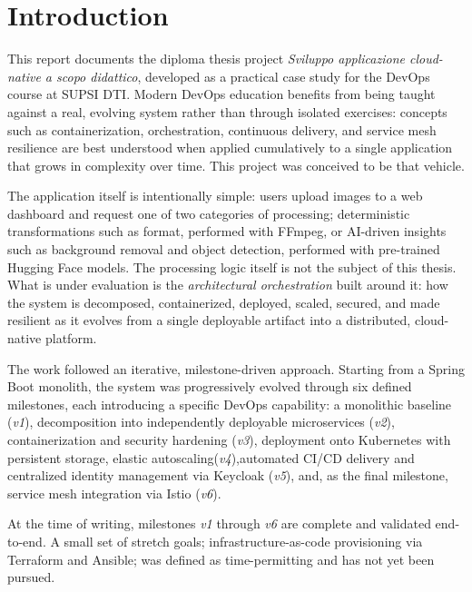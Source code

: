 \documentclass[twoside]{supsistudent}
\begin{document}
\tableofcontents
\listoffigures					%
\listoftables					%

\newpage
\mainmatter
{}
\setcounter{page}{1}

\chapter{Introduction}
This report documents the diploma thesis project \emph{Sviluppo applicazione cloud-native a scopo didattico}, developed as a practical case study for the DevOps course at SUPSI DTI. Modern DevOps education benefits from being taught against a real, evolving system rather than through isolated exercises: concepts such as containerization, orchestration, continuous delivery, and service mesh resilience are best understood when applied cumulatively to a single application that grows in complexity over time. This project was conceived to be that vehicle.

The application itself is intentionally simple: users upload images to a web dashboard and request one of two categories of processing; deterministic transformations such as format, performed with FFmpeg, or AI-driven insights such as background removal and object detection, performed with pre-trained Hugging Face models. The processing logic itself is not the subject of this thesis. What is under evaluation is the \emph{architectural orchestration} built around it: how the system is decomposed, containerized, deployed, scaled, secured, and made resilient as it evolves from a single deployable artifact into a distributed, cloud-native platform.

The work followed an iterative, milestone-driven approach. Starting from a Spring Boot monolith, the system was progressively evolved through six defined milestones, each introducing a specific DevOps capability: a monolithic baseline (\emph{v1}), decomposition into independently deployable microservices (\emph{v2}), containerization and security hardening (\emph{v3}), deployment onto Kubernetes with persistent storage, elastic autoscaling(\emph{v4}),automated CI/CD delivery and centralized identity management via Keycloak (\emph{v5}), and, as the final milestone, service mesh integration via Istio (\emph{v6}).

At the time of writing, milestones \emph{v1} through \emph{v6} are complete and validated end-to-end. A small set of stretch goals; infrastructure-as-code provisioning via Terraform and Ansible; was defined as time-permitting and has not yet been pursued.
\end{document}
